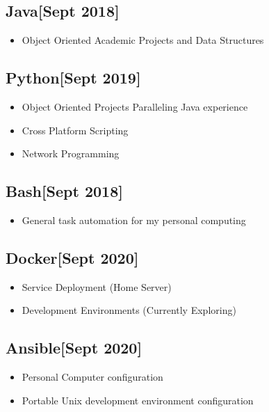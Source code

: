 \documentclass{article}
\begin{document}
    \subsection{\textbf{Java}\hfill{[Sept 2018]}}
        \begin{itemize}
            \item Object Oriented Academic Projects and Data Structures
        \end{itemize}

    \subsection{\textbf{Python}\hfill{[Sept 2019]}}
        \begin{itemize}
            \item Object Oriented Projects Paralleling Java experience
            \item Cross Platform Scripting
            \item Network Programming
        \end{itemize}

    \subsection{\textbf{Bash}\hfill{[Sept 2018]}}
        \begin{itemize}
            \item General task automation for my personal computing
        \end{itemize}

    \subsection{\textbf{Docker}\hfill{[Sept 2020]}}
        \begin{itemize}
            \item Service Deployment (Home Server)
            \item Development Environments (Currently Exploring)
        \end{itemize}

    \subsection{\textbf{Ansible}\hfill{[Sept 2020]}}
        \begin{itemize}
            \item Personal Computer configuration
            \item Portable Unix development environment configuration
        \end{itemize}
\end{document}
